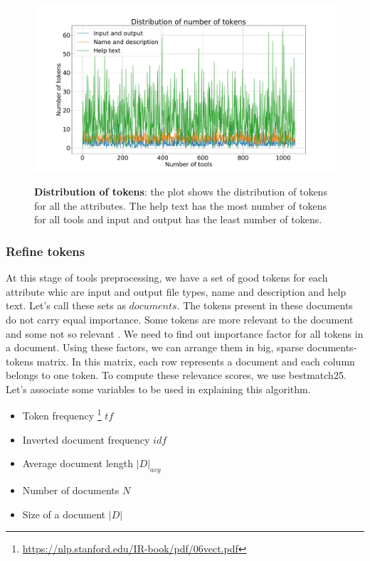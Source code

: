 \begin{figure}[h]
\begin{centering}
    {\includegraphics[scale=0.33]{figures/Tokens_dist.pdf}}
    \caption[Tokens distribution]{\textbf{Distribution of tokens}: the plot shows the distribution of tokens for all the attributes. The help text has the most number of tokens for all tools and input and output has the least number of tokens.}
\end{centering}
\end{figure}

\subsubsection{Refine tokens}
    At this stage of tools preprocessing, we have a set of good tokens for each attribute whic are input and output file types, name and description and help text. Let's call these sets as $documents$. The tokens present in these documents do not carry equal importance. Some tokens are more relevant to the document and some not so relevant . We need to find out importance factor for all tokens in a document. Using these factors, we can arrange them in big, sparse documents-tokens matrix. In this matrix, each row represents a document and each column belongs to one token. To compute these relevance scores, we use bestmatch25. Let's associate some variables to be used in explaining this algorithm.
    \begin{itemize}
	\item Token frequency \footnote{\url{https://nlp.stanford.edu/IR-book/pdf/06vect.pdf}} $tf$
	\item Inverted document frequency $idf$
	\item Average document length $|D|_{avg}$
	\item Number of documents $N$
	\item Size of a document $|D|$
\end{itemize}
    
